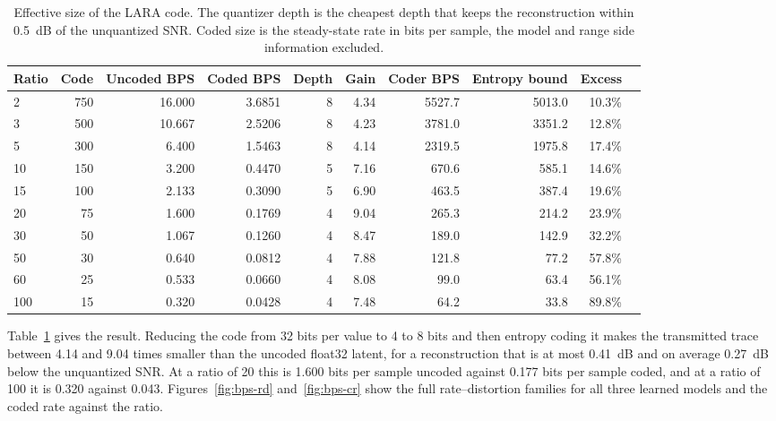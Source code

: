 \documentclass[fleqn,10pt]{wlscirep}
\begin{document}
\begin{table}[!t]
\centering
\small
\caption{Effective size of the LARA code. The quantizer depth is the cheapest depth that keeps the reconstruction within 0.5~dB of the unquantized SNR. Coded size is the steady-state rate in bits per sample, the model and range side information excluded.}
\label{tab:bitrate}
\begin{tabular}{lrrrrrrrrr}
\toprule
Ratio & Code & Uncoded BPS & Coded BPS & Depth & Gain & Coder BPS & Entropy bound & Excess \\
\midrule
2   & 750 & 16.000 & 3.6851 & 8 & 4.34 & 5527.7 & 5013.0 & 10.3\% \\
3   & 500 & 10.667 & 2.5206 & 8 & 4.23 & 3781.0 & 3351.2 & 12.8\% \\
5   & 300 & 6.400 & 1.5463 & 8 & 4.14 & 2319.5 & 1975.8 & 17.4\% \\
10  & 150 & 3.200 & 0.4470 & 5 & 7.16 & 670.6 & 585.1 & 14.6\% \\
15  & 100 & 2.133 & 0.3090 & 5 & 6.90 & 463.5 & 387.4 & 19.6\% \\
20  & 75  & 1.600 & 0.1769 & 4 & 9.04 & 265.3 & 214.2 & 23.9\% \\
30  & 50  & 1.067 & 0.1260 & 4 & 8.47 & 189.0 & 142.9 & 32.2\% \\
50  & 30  & 0.640 & 0.0812 & 4 & 7.88 & 121.8 & 77.2 & 57.8\% \\
60  & 25  & 0.533 & 0.0660 & 4 & 8.08 & 99.0 & 63.4 & 56.1\% \\
100 & 15  & 0.320 & 0.0428 & 4 & 7.48 & 64.2 & 33.8 & 89.8\% \\
\bottomrule
\end{tabular}
\end{table}

Table~\ref{tab:bitrate} gives the result. Reducing the code from 32 bits per value to 4 to 8 bits and then entropy coding it makes the transmitted trace between 4.14 and 9.04 times smaller than the uncoded float32 latent, for a reconstruction that is at most 0.41~dB and on average 0.27~dB below the unquantized SNR. At a ratio of 20 this is 1.600 bits per sample uncoded against 0.177 bits per sample coded, and at a ratio of 100 it is 0.320 against 0.043. Figures~\ref{fig:bps-rd} and~\ref{fig:bps-cr} show the full rate--distortion families for all three learned models and the coded rate against the ratio.
\end{document}
